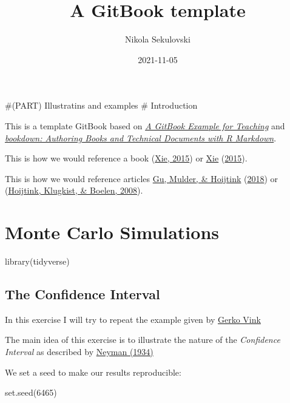 \documentclass[
]{book}
\title{A GitBook template}
\author{Nikola Sekulovski}
\date{2021-11-05}
\newenvironment{Shaded}{\begin{snugshade}}{\end{snugshade}}
\newcommand{\DecValTok}[1]{\textcolor[rgb]{0.00,0.00,0.81}{#1}}
\newcommand{\FunctionTok}[1]{\textcolor[rgb]{0.00,0.00,0.00}{#1}}
\newcommand{\NormalTok}[1]{#1}
\begin{document}
\maketitle

{
\setcounter{tocdepth}{1}
\tableofcontents
}
\#(PART) Illustratins and examples
\# Introduction

This is a template GitBook based on \href{https://cjvanlissa.github.io/gitbook-demo/}{\emph{A GitBook Example for Teaching}} and \href{https://bookdown.org/yihui/bookdown/}{\emph{bookdown: Authoring Books and Technical Documents with R Markdown}}.

This is how we would reference a book (\protect\hyperlink{ref-xie2015}{Xie, 2015}) or \protect\hyperlink{ref-xie2015}{Xie} (\protect\hyperlink{ref-xie2015}{2015}).

This is how we would reference articles \protect\hyperlink{ref-gu2018approximated}{Gu, Mulder, \& Hoijtink} (\protect\hyperlink{ref-gu2018approximated}{2018}) or (\protect\hyperlink{ref-hoijtink2008bayesian}{Hoijtink, Klugkist, \& Boelen, 2008}).

\hypertarget{monte-carlo-simulations}{%
\chapter{Monte Carlo Simulations}\label{monte-carlo-simulations}}

\begin{Shaded}
\begin{Highlighting}[]
\FunctionTok{library}\NormalTok{(tidyverse)}
\end{Highlighting}
\end{Shaded}

\hypertarget{the-confidence-interval}{%
\section{The Confidence Interval}\label{the-confidence-interval}}

In this exercise I will try to repeat the example given by \href{https://www.gerkovink.com/markup/Wk1/Solution_to_Ex1.html}{Gerko Vink}

The main idea of this exercise is to illustrate the nature of the \emph{Confidence Interval} as described by \href{http://www.stat.cmu.edu/~brian/905-2008/papers/neyman-1934-jrss.pdf}{Neyman (1934)}

We set a seed to make our results reproducible:

\begin{Shaded}
\begin{Highlighting}[]
\FunctionTok{set.seed}\NormalTok{(}\DecValTok{6465}\NormalTok{)}
\end{Highlighting}
\end{Shaded}
\end{document}
